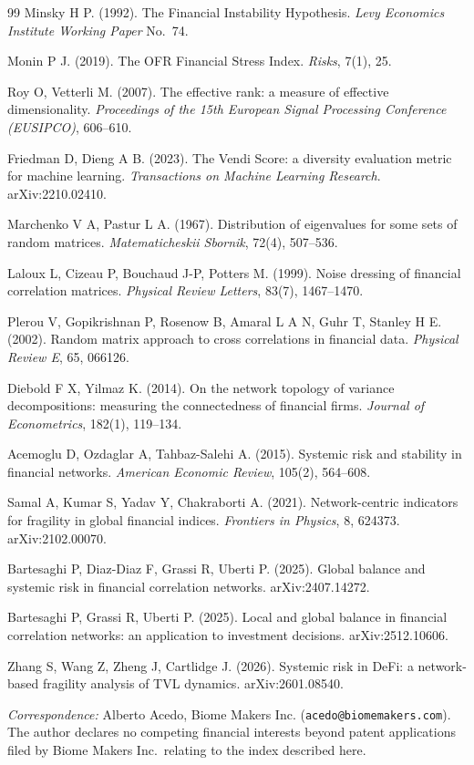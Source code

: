\documentclass[11pt,a4paper]{article}
\begin{document}
\begin{thebibliography}{99}
Minsky H P. (1992).
The Financial Instability Hypothesis.
\textit{Levy Economics Institute Working Paper} No.\ 74.

Monin P J. (2019).
The OFR Financial Stress Index.
\textit{Risks}, 7(1), 25.

Roy O, Vetterli M. (2007).
The effective rank: a measure of effective dimensionality.
\textit{Proceedings of the 15th European Signal Processing Conference
(EUSIPCO)}, 606--610.

Friedman D, Dieng A B. (2023).
The Vendi Score: a diversity evaluation metric for machine learning.
\textit{Transactions on Machine Learning Research}. arXiv:2210.02410.

Marchenko V A, Pastur L A. (1967).
Distribution of eigenvalues for some sets of random matrices.
\textit{Matematicheskii Sbornik}, 72(4), 507--536.

Laloux L, Cizeau P, Bouchaud J-P, Potters M. (1999).
Noise dressing of financial correlation matrices.
\textit{Physical Review Letters}, 83(7), 1467--1470.

Plerou V, Gopikrishnan P, Rosenow B, Amaral L A N, Guhr T, Stanley H E. (2002).
Random matrix approach to cross correlations in financial data.
\textit{Physical Review E}, 65, 066126.

Diebold F X, Yilmaz K. (2014).
On the network topology of variance decompositions: measuring the
connectedness of financial firms.
\textit{Journal of Econometrics}, 182(1), 119--134.

Acemoglu D, Ozdaglar A, Tahbaz-Salehi A. (2015).
Systemic risk and stability in financial networks.
\textit{American Economic Review}, 105(2), 564--608.

Samal A, Kumar S, Yadav Y, Chakraborti A. (2021).
Network-centric indicators for fragility in global financial indices.
\textit{Frontiers in Physics}, 8, 624373. arXiv:2102.00070.

Bartesaghi P, Diaz-Diaz F, Grassi R, Uberti P. (2025).
Global balance and systemic risk in financial correlation networks.
arXiv:2407.14272.

Bartesaghi P, Grassi R, Uberti P. (2025).
Local and global balance in financial correlation networks: an application to
investment decisions.
arXiv:2512.10606.

Zhang S, Wang Z, Zheng J, Cartlidge J. (2026).
Systemic risk in DeFi: a network-based fragility analysis of TVL dynamics.
arXiv:2601.08540.

\end{thebibliography}

\vspace{1em}
\noindent\textit{Correspondence:} Alberto Acedo, Biome Makers Inc.
(\texttt{acedo@biomemakers.com}).
The author declares no competing financial interests beyond patent
applications filed by Biome Makers Inc.\ relating to the index described
here.
\end{document}

